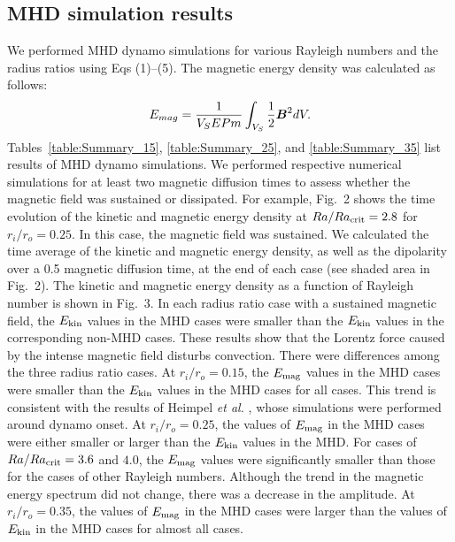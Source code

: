 \subsection{MHD simulation results}

We performed MHD dynamo simulations for various Rayleigh numbers and the radius ratios using Eqs (1)--(5). The magnetic energy density was calculated as follows:
%
\begin{equation}
E_{mag} = \frac{1}{V_{S}E Pm} \int_{V_{S}} \frac{1}{2} \mbox{\boldmath$B$}^{2} dV.
\label{eq:magnetic_energy}
\end{equation}
%
Tables~\ref{table:Summary_15}, \ref{table:Summary_25}, and \ref{table:Summary_35} list results of MHD dynamo simulations. 
We performed respective numerical simulations for at least two magnetic diffusion times to assess whether the magnetic field was sustained or dissipated. 
For example, Fig.~2 shows the time evolution of the kinetic and magnetic energy density at $Ra/Ra_{\rm crit} = 2.8$ for $r_i/r_o = 0.25$. 
In this case, the magnetic field was sustained. 
We calculated the time average of the kinetic and magnetic energy density, as well as the dipolarity over a 0.5 magnetic diffusion time, at the end of each case (see shaded area in Fig.~2). The kinetic and magnetic energy density as a function of Rayleigh number is shown in Fig.~3.%
In each radius ratio case with a sustained magnetic field, the $E_{\rm kin}$ values in the MHD cases were smaller than the $E_{\rm kin}$ values in the corresponding non-MHD cases. 
These results show that the Lorentz force caused by the intense magnetic field disturbs convection.
There were differences among the three radius ratio cases. 
At $r_i/r_o = 0.15$, the $E_{\rm mag}$ values in the MHD cases were smaller than the $E_{\rm kin}$ values in the MHD cases for all cases. 
This trend is consistent with the results of Heimpel {\it et al.} , whose simulations were performed around dynamo onset. 
At $r_i/r_o = 0.25$, the values of $E_{\rm mag}$ in the MHD cases were either smaller or larger than the $E_{\rm kin}$ values in the MHD. For cases of $Ra/Ra_{\rm crit}  = 3.6$ and $4.0$, the $E_{\rm mag}$ values were significantly smaller than those for the cases of other Rayleigh numbers. 
Although the trend in the magnetic energy spectrum did not change, there was a decrease in the amplitude. At $r_i/r_o = 0.35$, the values of $E_{\rm mag}$ in the MHD cases were larger than the values of $E_{\rm kin}$ in the MHD cases for almost all cases. 
